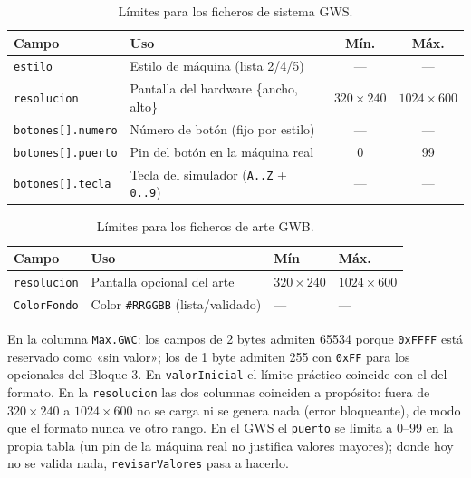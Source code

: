 \begin{table}[H]
	\centering
	\begin{tabularx}{\textwidth}{l X c c}
		\toprule
		\textbf{Campo} & \textbf{Uso} & \textbf{Mín.} & \textbf{Máx.} \\
		\midrule
		\texttt{estilo} & Estilo de máquina (lista 2/4/5) & --- & --- \\
		\texttt{resolucion} & Pantalla del hardware \{ancho, alto\}\footnotemark & $320\times240$ & $1024\times600$ \\
		\texttt{botones[].numero} & Número de botón (fijo por estilo) & --- & --- \\
		\texttt{botones[].puerto} & Pin del botón en la máquina real & 0 & 99 \\
		\texttt{botones[].tecla} & Tecla del simulador (\texttt{A..Z} + \texttt{0..9}) & --- & --- \\
		\bottomrule
	\end{tabularx}
	\caption{Límites para los ficheros de sistema GWS.}
	\label{tab:limites_gws}
\end{table}


\begin{table}[H]
	\centering
	\begin{tabularx}{\textwidth}{l X l l}
		\toprule
		\textbf{Campo} & \textbf{Uso} & \textbf{Mín} &  \textbf{Máx.} \\
		\midrule
		\texttt{resolucion} & Pantalla opcional del arte\footnotemark & $320\times240$ & $1024\times600$ \\
		\texttt{ColorFondo} & Color \texttt{\#RRGGBB} (lista/validado) & --- & --- \\
		\bottomrule
	\end{tabularx}
	\caption{Límites para los ficheros de arte GWB.}
	\label{tab:limites_gwb}
\end{table}



En la columna \texttt{Max.GWC}: los campos de 2 bytes admiten 65534 porque \texttt{0xFFFF} está reservado como «sin valor»; los de 1 byte admiten 255 con \texttt{0xFF} para los opcionales del Bloque 3. En \texttt{valorInicial} el límite práctico coincide con el del formato. En la \texttt{resolucion} las dos columnas coinciden a propósito: fuera de $320\times240$ a $1024\times600$ no se carga ni se genera nada (error bloqueante), de modo que el formato nunca ve otro rango. En el GWS el \texttt{puerto} se limita a 0--99 en la propia tabla (un pin de la máquina real no justifica valores mayores); donde hoy no se valida nada, \texttt{revisarValores} pasa a hacerlo.

